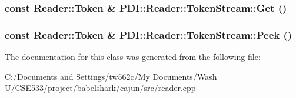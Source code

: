 \hypertarget{class_p_d_i_1_1_reader_1_1_token_stream_99575408138c02f46c02fc84ef843526}{
\subsubsection[{Get}]{\setlength{\rightskip}{0pt plus 5cm}const {\bf Reader::Token} \& PDI::Reader::TokenStream::Get ()}}
\label{class_p_d_i_1_1_reader_1_1_token_stream_99575408138c02f46c02fc84ef843526}


\hypertarget{class_p_d_i_1_1_reader_1_1_token_stream_b23d96c6997875a44efd695206663577}{
\subsubsection[{Peek}]{\setlength{\rightskip}{0pt plus 5cm}const {\bf Reader::Token} \& PDI::Reader::TokenStream::Peek ()}}
\label{class_p_d_i_1_1_reader_1_1_token_stream_b23d96c6997875a44efd695206663577}




The documentation for this class was generated from the following file:\begin{CompactItemize}
\item 
C:/Documents and Settings/tw562c/My Documents/Wash U/CSE533/project/babelshark/cajun/src/\hyperlink{reader_8cpp}{reader.cpp}\end{CompactItemize}
